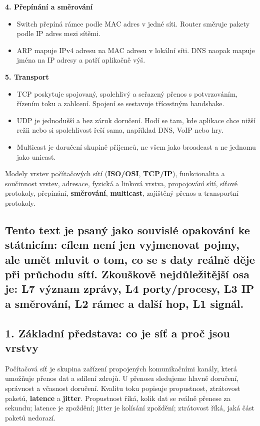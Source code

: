 \textbf{4. Přepínání a směrování}
\begin{itemize}
  \item Switch přepíná rámce podle MAC adres v jedné síti. Router směruje pakety podle IP adres mezi sítěmi.
  \item ARP mapuje IPv4 adresu na MAC adresu v lokální síti. DNS naopak mapuje jména na IP adresy a patří aplikačně výš.
\end{itemize}

\textbf{5. Transport}
\begin{itemize}
  \item TCP poskytuje spojovaný, spolehlivý a seřazený přenos s potvrzováním, řízením toku a zahlcení. Spojení se sestavuje třícestným handshake.
  \item UDP je jednodušší a bez záruk doručení. Hodí se tam, kde aplikace chce nižší režii nebo si spolehlivost řeší sama, například DNS, VoIP nebo hry.
  \item Multicast je doručení skupině příjemců, ne všem jako broadcast a ne jednomu jako unicast.
\end{itemize}

Modely vrstev počítačových sítí (\textbf{ISO/OSI}, \textbf{TCP/IP}), funkcionalita a součinnost vrstev, adresace, fyzická a linková vrstva, propojování sítí, síťové protokoly, přepínání, \textbf{směrování}, \textbf{multicast}, zajištěný přenos a transportní protokoly.

\subsection*{Tento text je psaný jako souvislé opakování ke státnicím: cílem není jen vyjmenovat pojmy, ale umět mluvit o tom, co se s daty reálně děje při průchodu sítí. Zkouškově nejdůležitější osa je: L7 význam zprávy, L4 porty/procesy, L3 IP a směrování, L2 rámec a další hop, L1 signál.}

\subsection*{1. Základní představa: co je síť a proč jsou vrstvy}

Počítačová síť je skupina zařízení propojených komunikačními kanály, která umožňuje přenos dat a sdílení zdrojů. U přenosu sledujeme hlavně doručení, správnost a včasnost doručení. Kvalitu toku popisuje propustnost, ztrátovost paketů, \textbf{latence} a \textbf{jitter}. Propustnost říká, kolik dat se reálně přenese za sekundu; latence je zpoždění; jitter je kolísání zpoždění; ztrátovost říká, jaká část paketů nedorazí.

